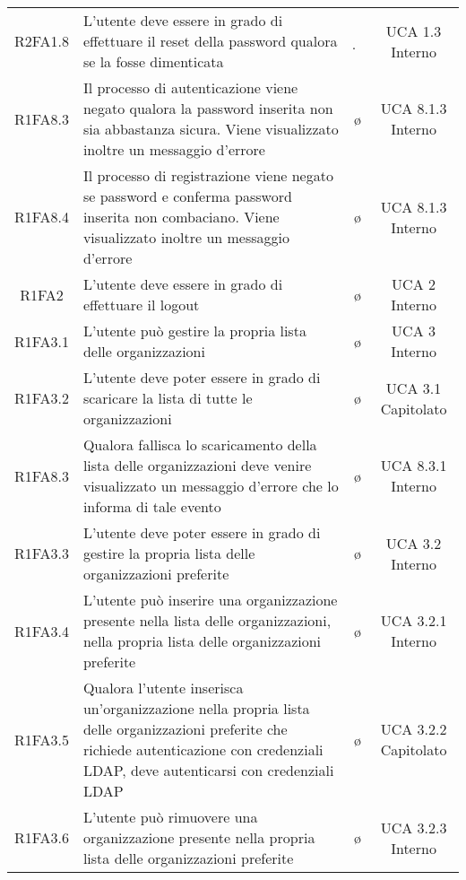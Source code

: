 {\begin{longtable}{ c C{8cm} c c}
R2FA1.8 & L'utente deve essere in grado di effettuare il reset della password qualora se la fosse dimenticata & \d & UCA 1.3 Interno\\

R1FA8.3 & Il processo di autenticazione viene negato qualora la password inserita non sia abbastanza sicura. Viene visualizzato inoltre un messaggio d'errore & \o & UCA 8.1.3 Interno\\

R1FA8.4 & Il processo di registrazione viene negato se password e conferma password inserita non combaciano. Viene visualizzato inoltre un messaggio d'errore & \o & UCA 8.1.3 Interno\\


R1FA2 & L'utente deve essere in grado di effettuare il logout & \o & UCA 2 Interno\\

R1FA3.1 & L'utente può gestire la propria lista delle organizzazioni& \o & UCA 3 Interno\\

R1FA3.2 & L'utente deve poter essere in grado di scaricare la lista di tutte le organizzazioni & \o & UCA 3.1 Capitolato \\

R1FA8.3 & Qualora fallisca lo scaricamento della lista delle organizzazioni deve venire visualizzato un messaggio d'errore che lo informa di tale evento & \o & UCA 8.3.1 Interno \\

R1FA3.3 & L’utente deve poter essere in grado di gestire la propria lista delle organizzazioni preferite & \o & UCA 3.2 Interno \\

R1FA3.4 & L’utente può inserire una organizzazione presente nella lista delle organizzazioni, nella propria lista delle organizzazioni preferite & \o & UCA 3.2.1 Interno \\

R1FA3.5 & Qualora l’utente inserisca un'organizzazione nella propria lista delle organizzazioni preferite che richiede autenticazione con credenziali LDAP, deve autenticarsi con credenziali LDAP & \o & UCA 3.2.2 Capitolato\\

R1FA3.6 & L’utente può rimuovere una organizzazione presente nella propria lista delle organizzazioni preferite & \o & UCA 3.2.3 Interno \\


\end{longtable}}
